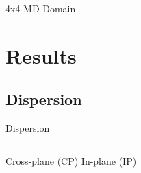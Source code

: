 \documentclass{beamer}
\begin{document}
\begin{frame}{\small{4x4 MD Domain}}
\begin{figure}[t]
\begin{center}
\vspace*{-0.8cm}
\renewcommand{\figure}{Fig.}
\label{fig:md_domain}
\end{center}
\end{figure}
\end{frame}

\section{Results}
\subsection{Dispersion}
\begin{frame}{\small{Dispersion}}
\begin{columns}
Cross-plane (CP)
\newline
\newline
\newline
\newline
\newline
In-plane (IP)
\begin{figure}[!h]
\vspace*{-0.8cm}
\begin{center}
\renewcommand{\figure}{Fig.}
\label{fig:sed}
\end{center}
\end{figure}
\begin{figure}[!h]
\vspace*{-0.8cm}
\begin{center}
\renewcommand{\figure}{Fig.}
\label{fig:dispersion}
\end{center}
\end{figure}
\end{columns}
\end{frame}


\end{document}
